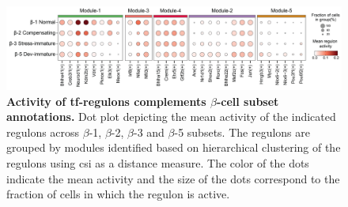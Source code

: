 \begin{figure}[t]
\centering
\includegraphics[width=\linewidth]{Chapter5/Fig/F3-12-v2-02.png}
\caption[Activity of -regulons complements $\beta$-cell subset annotations]{\textbf{Activity of \gls{tf}-regulons complements $\beta$-cell subset annotations.} Dot plot depicting the mean activity of the indicated regulons across $\beta$-1, $\beta$-2, $\beta$-3 and $\beta$-5 subsets. The regulons are grouped by modules identified based on hierarchical clustering of the regulons using \gls{csi} as a distance measure. The color of the dots indicate the mean activity and the size of the dots correspond to the fraction of cells in which the regulon is active.}
\label{fig:chp3_scenic_betasubsets}
\end{figure}




